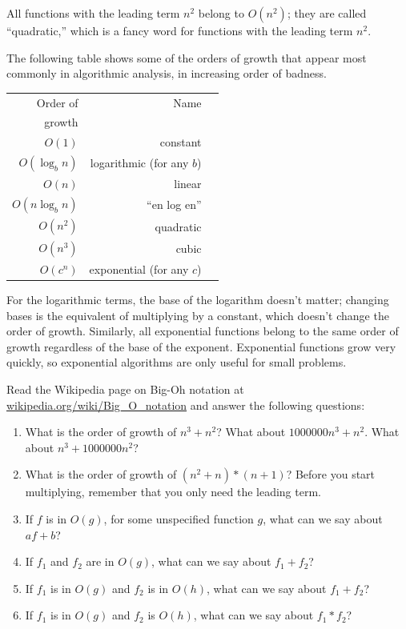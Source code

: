 \documentclass[10pt]{book}
\begin{document}
All functions with the leading term $n^2$ belong to $O(n^2)$; they are
called ``quadratic,'' which is a fancy word for functions with the
leading term $n^2$.

The following table shows some of the orders of growth that
appear most commonly in algorithmic analysis,
in increasing order of badness.

\begin{tabular}{|r|r|r|}
\hline
Order of     &   Name      \\
growth       &               \\
\hline
$O(1)$             & constant \\
$O(\log_b n)$      & logarithmic (for any $b$) \\
$O(n)$             & linear \\
$O(n \log_b n)$    & ``en log en'' \\
$O(n^2)$           & quadratic     \\
$O(n^3)$           & cubic     \\
$O(c^n)$           & exponential (for any $c$)    \\
\hline
\end{tabular}

For the logarithmic terms, the base of the logarithm doesn't matter;
changing bases is the equivalent of multiplying by a constant, which
doesn't change the order of growth.  Similarly, all exponential
functions belong to the same order of growth regardless of the base of
the exponent.
Exponential functions grow very quickly, so exponential algorithms are
only useful for small problems.


\begin{ex}

Read the Wikipedia page on Big-Oh notation at
\url{wikipedia.org/wiki/Big_O_notation} and
answer the following questions:

\begin{enumerate}

\item What is the order of growth of $n^3 + n^2$?
What about $1000000 n^3 + n^2$.
What about $n^3 + 1000000 n^2$?  

\item What is the order of growth of $(n^2 + n) * (n + 1)$?  Before
  you start multiplying, remember that you only need the leading term.

\item If $f$ is in $O(g)$, for some unspecified function $g$, what can
  we say about $a f + b$?

\item If $f_1$ and $f_2$ are in $O(g)$, what can we say about $f_1 + f_2$?

\item If  $f_1$ is in $O(g)$
and $f_2$ is in $O(h)$,
what can we say about  $f_1 + f_2$?

\item If  $f_1$ is in $O(g)$ and $f_2$ is $O(h)$,
what can we say about  $f_1 * f_2$?

\end{enumerate}

\end{ex}
\end{document}
